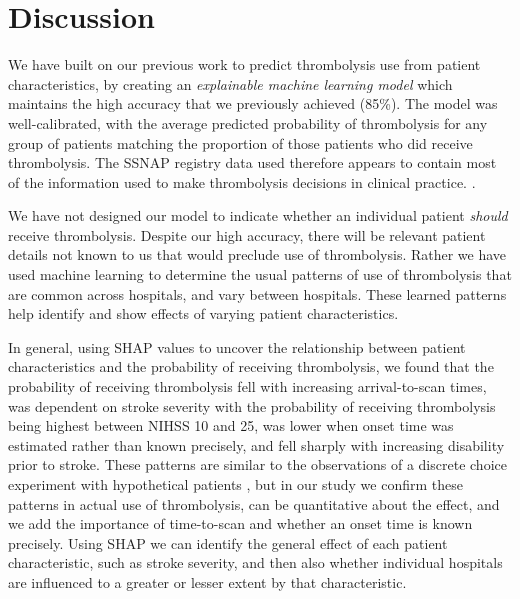 \section{Discussion}

We have built on our previous work to predict thrombolysis use from patient characteristics, by creating an \emph{explainable machine learning model} which maintains the high accuracy that we previously achieved (85\%). The model was well-calibrated, with the average predicted probability of thrombolysis for any group of patients matching the proportion of those patients who did receive thrombolysis. The SSNAP registry data used therefore appears to contain most of the information used to make thrombolysis decisions in clinical practice. .

We have not designed our model to indicate whether an individual patient \emph{should} receive thrombolysis. Despite our high accuracy, there will be relevant patient details not known to us that would preclude use of thrombolysis. Rather we have used machine learning to determine the usual patterns of use of thrombolysis that are common across hospitals, and vary between hospitals. These learned patterns help identify and show effects of varying patient characteristics.

In general, using SHAP values to uncover the relationship between patient characteristics and the probability of receiving thrombolysis, we found that the probability of receiving thrombolysis fell with increasing arrival-to-scan times, was dependent on stroke severity with the probability of receiving thrombolysis being highest between NIHSS 10 and 25, was lower when onset time was estimated rather than known precisely, and fell sharply with increasing disability prior to stroke. These patterns are similar to the observations of a discrete choice experiment with hypothetical patients \cite{de_brun_factors_2018}, but in our study we confirm these patterns in actual use of thrombolysis, can be quantitative about the effect, and we add the importance of time-to-scan and whether an onset time is known precisely. Using SHAP we can identify the general effect of each patient characteristic, such as stroke severity, and then also whether individual hospitals are influenced to a greater or lesser extent by that characteristic.

